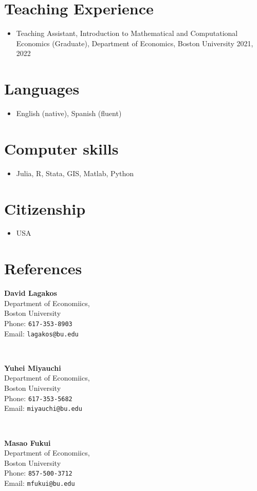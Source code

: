 \documentclass[12pt]{article}
\newenvironment{customitemize}
{ \begin{itemize}[
	leftmargin=\parindent,
	itemindent=-0.5\parindent,
	topsep = 0pt, 
	itemsep = -1pt, 
	label={}] }
{\end{itemize} }
\begin{document}
\section*{Teaching Experience}

\begin{customitemize}
	\item Teaching Assistant, Introduction to Mathematical and Computational Economics (Graduate), Department of Economics, Boston University \hfill 2021, 2022
\end{customitemize}

\section*{Languages}
\begin{customitemize}
\item English (native), Spanish (fluent)
\end{customitemize}

\section*{Computer skills}
\begin{customitemize}
\item Julia, R, Stata, GIS, Matlab, Python
\end{customitemize}

\section*{Citizenship}
\begin{customitemize}
\item USA
\end{customitemize}

\section*{References}
\begin{minipage}{0.3\textwidth}
\textbf{David Lagakos} \\
Department of Economiics,  \\
Boston University \\
Phone: \texttt{617-353-8903} \\
Email: \texttt{lagakos@bu.edu}
\end{minipage}
~
\begin{minipage}{0.3\textwidth}
\textbf{Yuhei Miyauchi} \\
Department of Economiics,  \\
Boston University \\
Phone: \texttt{617-353-5682} \\
Email: \texttt{miyauchi@bu.edu}
\end{minipage}
~
\begin{minipage}{0.3\textwidth}
\textbf{Masao Fukui} \\
Department of Economiics, \\
Boston University \\
Phone: \texttt{857-500-3712} \\
Email: \texttt{mfukui@bu.edu} 
\end{minipage}
\end{document}
